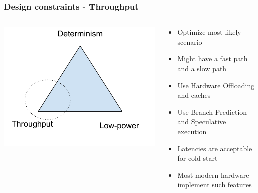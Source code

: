 \begin{frame}
	\frametitle{Design constraints - Throughput}
	\begin{columns}
	\begin{column}{0.35\textwidth}
	\includegraphics[width=\textwidth]{slides/realtime-linux-realtime-systems/triangle_design_throughput.pdf}
	\end{column}
		\begin{column}{0.65\textwidth}
			\begin{itemize}
				\item Optimize most-likely scenario
				\item Might have a fast path and a slow path
				\item Use Hardware Offloading and caches
				\item Use Branch-Prediction and Speculative execution
				\item Latencies are acceptable for cold-start
				\item Most modern hardware implement such features
			\end{itemize}
		\end{column}
	\end{columns}
\end{frame}

